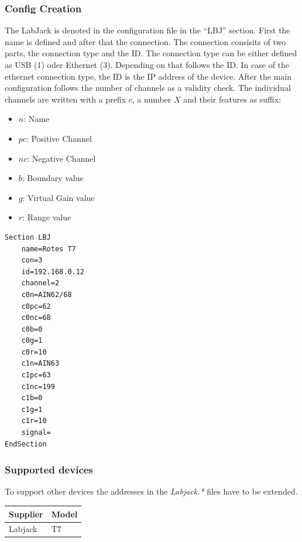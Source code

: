 \documentclass[10pt,a4paper]{article}
\begin{document}
	\subsubsection{Config Creation}	
	The LabJack is denoted in the configuration file in the \enquote{LBJ} section. First the name is defined and after that the connection. The connection consisits of two parts, the connection type and the ID. The connection type can be either defined as USB (1) oder Ethernet (3). Depending on that follows the ID. In case of the ethernet connection type, the ID is the IP address of the device. After the main configuration follows the number of channels as a validity check. The individual channels are written with a prefix $c$, a number $X$ and their features as suffix:
	
	\begin{itemize}
	\item $n$: Name
	\item $pc$: Positive Channel
	\item $nc$: Negative Channel
	\item $b$: Boundary value
	\item $g$: Virtual Gain value
	\item $r$: Range value
	\end{itemize}
	
\begin{lstlisting}[caption=LBJ Config]
Section LBJ
	name=Rotes T7
	con=3
	id=192.168.0.12
	channel=2
	c0n=AIN62/68
	c0pc=62
	c0nc=68
	c0b=0
	c0g=1
	c0r=10
	c1n=AIN63
	c1pc=63
	c1nc=199
	c1b=0
	c1g=1
	c1r=10
	signal=
EndSection
\end{lstlisting}
	
		\subsubsection{Supported devices}
		To support other devices the addresses in the \textit{Labjack.*} files have to be extended.
	
		\begin{table}[H]
		\centering
		\begin{tabular}{ll}
		\toprule
		Supplier			& Model \\ \midrule
		Labjack				& T7 \\
		\bottomrule
		\end{tabular}			
		\end{table}	
\end{document}
